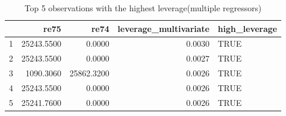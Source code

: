 \begin{table}[ht]
\centering
\begin{tabular}{rrrrl}
  \hline
 & re75 & re74 & leverage\_multivariate & high\_leverage \\ 
  \hline
1 & 25243.5500 & 0.0000 & 0.0030 & TRUE \\ 
  2 & 25243.5500 & 0.0000 & 0.0027 & TRUE \\ 
  3 & 1090.3060 & 25862.3200 & 0.0026 & TRUE \\ 
  4 & 25243.5500 & 0.0000 & 0.0026 & TRUE \\ 
  5 & 25241.7600 & 0.0000 & 0.0026 & TRUE \\ 
   \hline
\end{tabular}
\caption{Top 5 observations with the highest leverage(multiple regressors)} 
\label{tab:highest_leverage_re75_re74_education_black_hispanic_age}
\end{table}
